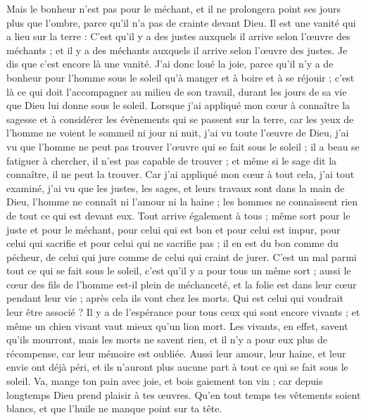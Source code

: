 \begin{multicols}{2}
Mais le bonheur n’est pas pour le méchant, et il ne prolongera point ses jours plus que l'ombre, parce qu'il n’a pas de crainte devant Dieu.
Il est une vanité qui a lieu sur la terre : C'est qu'il y a des justes auxquels il arrive selon l'œuvre des méchants ; et il y a des méchants auxquels il arrive selon l'œuvre des justes. Je dis que c’est encore là une vanité.
J'ai donc loué la joie, parce qu'il n'y a de bonheur pour l’homme sous le soleil qu’à manger et à boire et à se réjouir ; c'est là ce qui doit l’accompagner au milieu de son travail, durant les jours de sa vie que Dieu lui donne sous le soleil.
Lorsque j’ai appliqué mon cœur à connaître la sagesse et à considérer les évènements qui se passent sur la terre, car les yeux de l’homme ne voient le sommeil ni jour ni nuit,
j’ai vu toute l'œuvre de Dieu, j’ai vu que l'homme ne peut pas trouver l'œuvre qui se fait sous le soleil ; il a beau se fatiguer à chercher, il n’est pas capable de trouver ; et même si le sage dit la connaître, il ne peut la trouver.
\VerseOne{}Car j'ai appliqué mon cœur à tout cela, j’ai tout examiné, j’ai vu que les justes, les sages, et leurs travaux sont dans la main de Dieu, l’homme ne connaît ni l’amour ni la haine ; les hommes ne connaissent rien de tout ce qui est devant eux.
Tout arrive également à tous ; même sort pour le juste et pour le méchant, pour celui qui est bon et pour celui est impur, pour celui qui sacrifie et pour celui qui ne sacrifie pas ; il en est du bon comme du pécheur, de celui qui jure comme de celui qui craint de jurer.
C'est un mal parmi tout ce qui se fait sous le soleil, c’est qu’il y a pour tous un même sort ; aussi le cœur des fils de l’homme est-il plein de méchanceté, et la folie est dans leur cœur pendant leur vie ; après cela ils vont chez les morts. Qui est celui qui voudrait leur être associé ?
Il y a de l'espérance pour tous ceux qui sont encore vivants ; et même un chien vivant vaut mieux qu'un lion mort.
Les vivants, en effet, savent qu'ils mourront, mais les morts ne savent rien, et il n’y a pour eux plus de récompense, car leur mémoire est oubliée.
Aussi leur amour, leur haine, et leur envie ont déjà péri, et ils n'auront plus aucune part à tout ce qui se fait sous le soleil.
Va, mange ton pain avec joie, et bois gaiement ton vin ; car depuis longtemps Dieu prend plaisir à tes œuvres.
Qu’en tout temps tes vêtements soient blancs, et que l’huile ne manque point sur ta tête.

\end{multicols}
